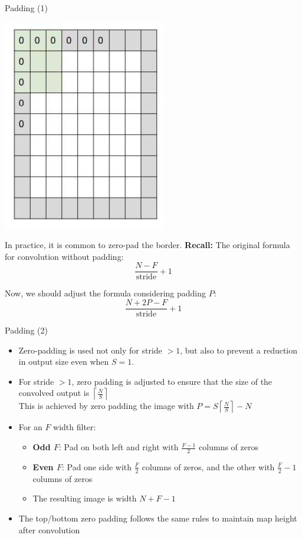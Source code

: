 \documentclass[default, aspectratio=169]{beamer}
\begin{document}
	\begin{frame}{Padding (1)}
		
		\begin{minipage}{0.28\textwidth} %
			\includegraphics[keepaspectratio, scale=0.6]{pic/zeropad.png}
		\end{minipage}
		\begin{minipage}{0.67\textwidth} %
			In practice, it is common to zero-pad the border.
			\smallskip
			\textbf{Recall:} The original formula for convolution without padding:
			\[
			\frac{N - F}{\text{stride}} + 1
			\]
			
			Now, we should adjust the formula considering padding $P$:
			\[
			\frac{N + 2P - F}{\text{stride}} + 1
			\]
		\end{minipage}
	\end{frame}
	\begin{frame}{Padding (2)}
		\begin{itemize}
			\item Zero-padding is used not only for stride $> 1$, but also to prevent a reduction in output size even when $S = 1$.
			
			\item For stride $> 1$, zero padding is adjusted to ensure that the size of the convolved output is $\left\lceil \frac{N}{S} \right\rceil$
			\\
			This is achieved by zero padding the image with  $ P = S\left\lceil \frac{N}{S} \right\rceil - N$
			
			\item For an $F$ width filter:
			\begin{itemize}
				\item \textbf{Odd $F$}: Pad on both left and right with $\frac{F-1}{2}$ columns of zeros
				\item \textbf{Even $F$}: Pad one side with $\frac{F}{2}$ columns of zeros, and the other with $\frac{F}{2} - 1$ columns of zeros
				\item The resulting image is width $N + F - 1$
			\end{itemize}
			\item The top/bottom zero padding follows the same rules to maintain map height after convolution
			
		\end{itemize}
	\end{frame}
\end{document}
